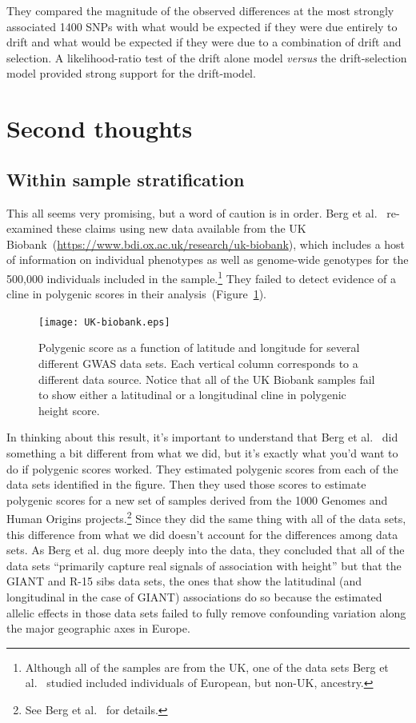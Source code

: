 \documentclass[12pt]{article}
\begin{document}
They compared the magnitude of the observed differences at the most
strongly associated 1400 SNPs with what would be expected if they were
due entirely to drift and what would be expected if they were due to a
combination of drift and selection. A likelihood-ratio test of the
drift alone model {\it versus\/} the drift-selection model provided
strong support for the drift-model.

\section*{Second thoughts}

\subsection*{Within sample stratification}

This all seems very promising, but a word of caution is in order. Berg
et al.~\cite{Berg-etal-2018} re-examined these claims using new data
available from the UK
Biobank~(\url{https://www.bdi.ox.ac.uk/research/uk-biobank}), which
includes a host of information on individual phenotypes as well as
genome-wide genotypes for the 500,000 individuals included in the
sample.\footnote{Although all of the samples are from the UK, one of
  the data sets Berg et al.~\cite{Berg-etal-2018} studied included
  individuals of European, but non-UK, ancestry.} They failed to
detect evidence of a cline in polygenic scores in their
analysis~(Figure~\ref{fig:UK-biobank}).

\begin{figure}
  \begin{center}
    \texttt{[image: UK-biobank.eps]}
  \end{center}
  \caption{Polygenic score as a function of latitude and longitude for
    several different GWAS data sets. Each vertical column corresponds
  to a different data source. Notice that all of the UK Biobank
  samples fail to show either a latitudinal or a longitudinal cline in
  polygenic height score.}\label{fig:UK-biobank} 
\end{figure}

In thinking about this result, it's important to understand that Berg
et al.~\cite{Berg-etal-2018} did something a bit different from what
we did, but it's exactly what you'd want to do if polygenic scores
worked. They estimated polygenic scores from each of the data sets
identified in the figure. Then they used those scores to estimate
polygenic scores for a new set of samples derived from the 1000
Genomes and Human Origins projects.\footnote{See Berg et
  al.~\cite{Berg-etal-2018} for details.} Since they did the same
thing with all of the data sets, this difference from what we did
doesn't account for the differences among data sets. As Berg et
al. dug more deeply into the data, they concluded that all of the data
sets ``primarily capture real signals of association with height'' but
that the GIANT and R-15 sibs data sets, the ones that show the
latitudinal (and longitudinal in the case of GIANT) associations do so
because the estimated allelic effects in those data sets failed to
fully remove confounding variation along the major geographic axes in
Europe.
\end{document}
